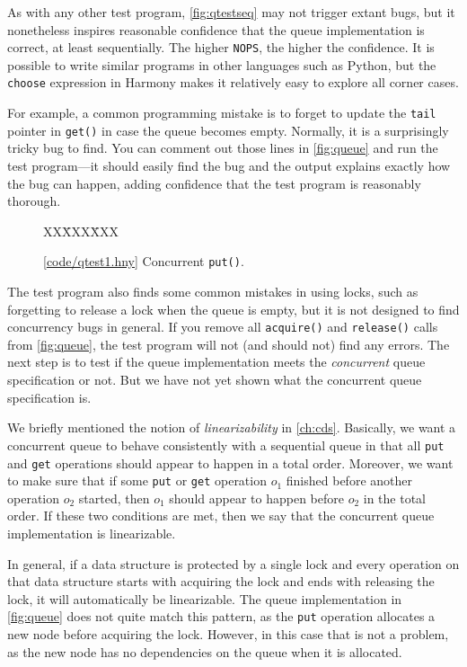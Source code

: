 \documentclass{report}
\newcommand{\harmonysource}[1]{
\begin{tabbing}
XX\=XXX\=XXX\kill
    
\end{tabbing}
}
\newcommand{\harmonylink}[1]{%
[\href{https://harmony.cs.cornell.edu/#1}{\underline{#1}}]%
}
\newenvironment{code}{
\tcolorbox
}{
\endtcolorbox
}
\begin{document}
As with any other test program,
\autoref{fig:qtestseq} may not trigger extant bugs, but
it nonetheless inspires reasonable confidence that the
queue implementation is correct, at least sequentially.
The higher \texttt{NOPS}, the higher the confidence.
It is possible to write similar programs in other languages
such as Python, but the \texttt{choose} expression in Harmony
makes it relatively easy to explore all corner cases.

For example, a common programming mistake is to forget to
update the \texttt{tail} pointer in \texttt{get()} in case
the queue becomes empty.  Normally, it is a surprisingly
tricky bug to find.  You can comment out those lines
in \autoref{fig:queue} and run the test program---it should
easily find the bug and the output explains exactly how
the bug can happen, adding confidence that the test program
is reasonably thorough.

\begin{figure}
\begin{code}
\harmonysource{qtest1}
\end{code}
\caption{\harmonylink{code/qtest1.hny} Concurrent \texttt{put()}.}
\label{fig:qtest1}
\end{figure}

The test program also finds some common mistakes in using
locks, such as forgetting to release a lock when the queue
is empty, but it is not designed to find concurrency bugs
in general.  If you remove all \texttt{acquire()} and
\texttt{release()} calls from \autoref{fig:queue},
the test program will not (and should not)
find any errors.
The next step is to test if the queue implementation
meets the \emph{concurrent} queue specification or not.
But we have not yet shown what the
concurrent queue specification is.

We briefly mentioned the notion of \emph{linearizability}
in \autoref{ch:cds}.
Basically, we want a concurrent queue to behave
consistently with a sequential queue in that all
\texttt{put}
and \texttt{get} operations should appear to happen
in a total order.
Moreover, we want to make sure that if some
\texttt{put} or \texttt{get} operation $o_1$ finished
before another operation $o_2$ started, then $o_1$
should appear to happen before $o_2$ in the total order.
If these two conditions are met, then we say that
the concurrent queue implementation is linearizable.

In general, if a data structure is protected by
a single lock and every operation on that data
structure starts with acquiring the lock and ends
with releasing the lock, it will automatically be
linearizable.
The queue implementation in \autoref{fig:queue} does
not quite match this pattern, as the \texttt{put}
operation allocates a new node before acquiring
the lock.
However, in this case that is not a problem, as
the new node has no dependencies on the queue
when it is allocated.
\end{document}
